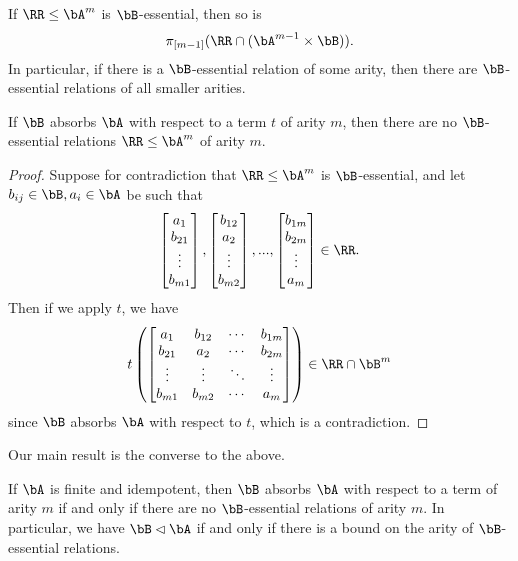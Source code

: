 \begin{prop} If $\RR \le \bA^m$ is $\bB$-essential, then so is
\[
\pi_{[m-1]}(\RR \cap (\bA^{m-1}\times\bB)).
\]
In particular, if there is a $\bB$-essential relation of some arity, then there are $\bB$-essential relations of all smaller arities.
\end{prop}

\begin{prop} If $\bB$ absorbs $\bA$ with respect to a term $t$ of arity $m$, then there are no $\bB$-essential relations $\RR \le \bA^m$ of arity $m$.
\end{prop}
\begin{proof} Suppose for contradiction that $\RR \le \bA^m$ is $\bB$-essential, and let $b_{ij} \in \bB, a_i \in \bA$ be such that
\[
\begin{bmatrix}a_1\\ b_{21}\\ \vdots\\ b_{m1}\end{bmatrix}, \begin{bmatrix}b_{12}\\ a_2\\ \vdots\\ b_{m2}\end{bmatrix}, ..., \begin{bmatrix}b_{1m}\\ b_{2m}\\ \vdots\\ a_m\end{bmatrix} \in \RR.
\]
Then if we apply $t$, we have
\[
t\left(\begin{bmatrix}a_1 & b_{12} & \cdots & b_{1m}\\ b_{21} & a_2 & \cdots & b_{2m}\\ \vdots & \vdots & \ddots & \vdots\\ b_{m1} & b_{m2} & \cdots & a_m\end{bmatrix}\right) \in \RR \cap \bB^m
\]
since $\bB$ absorbs $\bA$ with respect to $t$, which is a contradiction.
\end{proof}

Our main result is the converse to the above.

\begin{thm}\label{absorption-essential} If $\bA$ is finite and idempotent, then $\bB$ absorbs $\bA$ with respect to a term of arity $m$ if and only if there are no $\bB$-essential relations of arity $m$. In particular, we have $\bB \lhd \bA$ if and only if there is a bound on the arity of $\bB$-essential relations.
\end{thm}

